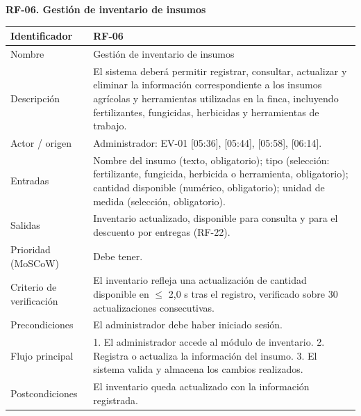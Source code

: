 \documentclass[12pt,a4paper]{article}
\begin{document}
\begin{minipage}{\linewidth}
\bigskip
\noindent\textbf{RF-06. Gestión de inventario de insumos}
\label{tab:RF-06}

\begin{center}
\begin{tabular}{|p{3.5cm}|p{10.7cm}|}
\hline
Identificador & RF-06 \\
\hline
Nombre & Gestión de inventario de insumos \\
\hline
Descripción & El sistema deberá permitir registrar, consultar, actualizar y eliminar la información correspondiente a los insumos agrícolas y herramientas utilizadas en la finca, incluyendo fertilizantes, fungicidas, herbicidas y herramientas de trabajo. \\
\hline
Actor / origen & Administrador: EV-01 [05:36], [05:44], [05:58], [06:14]. \\
\hline
Entradas & Nombre del insumo (texto, obligatorio); tipo (selección: fertilizante, fungicida, herbicida o herramienta, obligatorio); cantidad disponible (numérico, obligatorio); unidad de medida (selección, obligatorio). \\
\hline
Salidas & Inventario actualizado, disponible para consulta y para el descuento por entregas (RF-22). \\
\hline
Prioridad (MoSCoW) & Debe tener. \\
\hline
Criterio de verificación & El inventario refleja una actualización de cantidad disponible en $\leq$ 2,0 s tras el registro, verificado sobre 30 actualizaciones consecutivas. \\
\hline
Precondiciones & El administrador debe haber iniciado sesión. \\
\hline
Flujo principal & 1. El administrador accede al módulo de inventario. 2. Registra o actualiza la información del insumo. 3. El sistema valida y almacena los cambios realizados. \\
\hline
Postcondiciones & El inventario queda actualizado con la información registrada. \\
\hline
\end{tabular}
\end{center}
\end{minipage}
\end{document}

